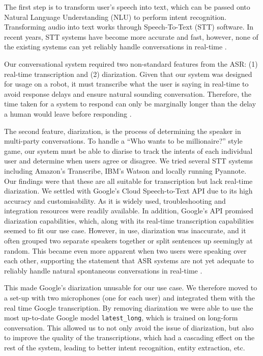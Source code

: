 \documentclass[hidelinks, 11pt]{article}
\begin{document}
The first step is to transform user's speech into text, which can be passed onto Natural Language Understanding (NLU) to perform intent recognition. Transforming audio into text works through Speech-To-Text (STT) software. In recent years, STT systems have become more accurate and fast, however, none of the existing systems can yet reliably handle conversations in real-time \cite{addlesee_comprehensive_2020}.

Our conversational system required two non-standard features from the ASR: (1) real-time transcription and (2) diarization. Given that our system was designed for usage on a robot, it must transcribe what the user is saying in real-time to avoid response delays and ensure natural sounding conversation. Therefore, the time taken for a system to respond can only be marginally longer than the delay a human would leave before responding \cite{Miller_1968}.

The second feature, diarization, is the process of determining the speaker in multi-party conversations. To handle a ``Who wants to be millionaire?'' style game, our system must be able to diarise to track the intents of each individual user and determine when users agree or disagree. We tried several STT systems including Amazon's Transcribe, IBM's Watson and locally running Pyannote. Our findings were that these are all suitable for transcription but lack real-time diarization. We settled with Google's Cloud Speech-to-Text API due to its high accuracy and customisability. As it is widely used, troubleshooting and integration resources were readily available. In addition, Google's API promised diarization capabilities, which, along with its real-time transcription capabilities seemed to fit our use case. However, in use, diarization was inaccurate, and it often grouped two separate speakers together or split sentences up seemingly at random. This became even more apparent when two users were speaking over each other, supporting the statement that ASR systems are not yet adequate to reliably handle natural spontaneous conversations in real-time \cite{addlesee_comprehensive_2020}.

This made Google's diarization unusable for our use case. We therefore moved to a set-up with two microphones (one for each user) and integrated them with the real time Google transcription. By removing diarization we were able to use the most up-to-date Google model \verb|latest_long|, which is trained on long-form conversation. This allowed us to not only avoid the issue of diarization, but also to improve the quality of the transcriptions, which had a cascading effect on the rest of the system, leading to better intent recognition, entity extraction, etc.
\end{document}
